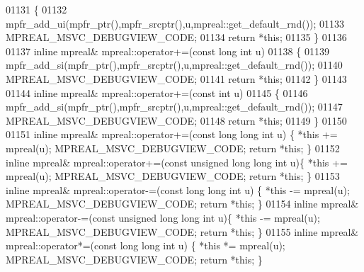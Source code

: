 \begin{DoxyCode}
01131 \{
01132     mpfr\_add\_ui(mpfr\_ptr(),mpfr\_srcptr(),u,mpreal::get\_default\_rnd());
01133     MPREAL\_MSVC\_DEBUGVIEW\_CODE;
01134     \textcolor{keywordflow}{return} *\textcolor{keyword}{this};
01135 \}
01136 
01137 \textcolor{keyword}{inline} mpreal& mpreal::operator+=(\textcolor{keyword}{const} \textcolor{keywordtype}{long} \textcolor{keywordtype}{int} u)
01138 \{
01139     mpfr\_add\_si(mpfr\_ptr(),mpfr\_srcptr(),u,mpreal::get\_default\_rnd());
01140     MPREAL\_MSVC\_DEBUGVIEW\_CODE;
01141     \textcolor{keywordflow}{return} *\textcolor{keyword}{this};
01142 \}
01143 
01144 \textcolor{keyword}{inline} mpreal& mpreal::operator+=(\textcolor{keyword}{const} \textcolor{keywordtype}{int} u)
01145 \{
01146     mpfr\_add\_si(mpfr\_ptr(),mpfr\_srcptr(),u,mpreal::get\_default\_rnd());
01147     MPREAL\_MSVC\_DEBUGVIEW\_CODE;
01148     \textcolor{keywordflow}{return} *\textcolor{keyword}{this};
01149 \}
01150 
01151 \textcolor{keyword}{inline} mpreal& mpreal::operator+=(\textcolor{keyword}{const} \textcolor{keywordtype}{long} \textcolor{keywordtype}{long} \textcolor{keywordtype}{int} u)         \{    *\textcolor{keyword}{this} += mpreal(u); 
      MPREAL\_MSVC\_DEBUGVIEW\_CODE; \textcolor{keywordflow}{return} *\textcolor{keyword}{this};    \}
01152 \textcolor{keyword}{inline} mpreal& mpreal::operator+=(\textcolor{keyword}{const} \textcolor{keywordtype}{unsigned} \textcolor{keywordtype}{long} \textcolor{keywordtype}{long} \textcolor{keywordtype}{int} u)\{    *\textcolor{keyword}{this} += mpreal(u); 
      MPREAL\_MSVC\_DEBUGVIEW\_CODE; \textcolor{keywordflow}{return} *\textcolor{keyword}{this};    \}
01153 \textcolor{keyword}{inline} mpreal& mpreal::operator-=(\textcolor{keyword}{const} \textcolor{keywordtype}{long} \textcolor{keywordtype}{long} \textcolor{keywordtype}{int}  u)        \{    *\textcolor{keyword}{this} -= mpreal(u); 
      MPREAL\_MSVC\_DEBUGVIEW\_CODE; \textcolor{keywordflow}{return} *\textcolor{keyword}{this};    \}
01154 \textcolor{keyword}{inline} mpreal& mpreal::operator-=(\textcolor{keyword}{const} \textcolor{keywordtype}{unsigned} \textcolor{keywordtype}{long} \textcolor{keywordtype}{long} \textcolor{keywordtype}{int} u)\{    *\textcolor{keyword}{this} -= mpreal(u); 
      MPREAL\_MSVC\_DEBUGVIEW\_CODE; \textcolor{keywordflow}{return} *\textcolor{keyword}{this};    \}
01155 \textcolor{keyword}{inline} mpreal& mpreal::operator*=(\textcolor{keyword}{const} \textcolor{keywordtype}{long} \textcolor{keywordtype}{long} \textcolor{keywordtype}{int}  u)        \{    *\textcolor{keyword}{this} *= mpreal(u); 
      MPREAL\_MSVC\_DEBUGVIEW\_CODE; \textcolor{keywordflow}{return} *\textcolor{keyword}{this};    \}

\end{DoxyCode}
